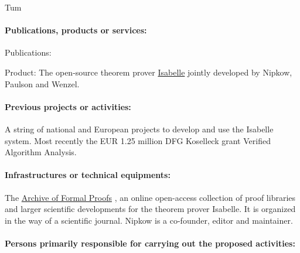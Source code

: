 \begin{sitedescription}{Tum}
\begin{compactitem}
\item{} 
\end{compactitem}

\paragraph{Publications, products or services:}
Publications: \cite{LNCS2283,BlanchetteHMN-CICM15,Wenzel:2015:APPA,PaulsonNW-FAC19}

Product: The open-source theorem prover  \href{https://isabelle.in.tum.de}{Isabelle}
jointly developed by Nipkow, Paulson and Wenzel.

\paragraph{Previous projects or activities:}

A string of national and European projects to develop and use the Isabelle
system. Most recently the EUR 1.25 million DFG Koselleck grant Verified Algorithm Analysis.

\paragraph{Infrastructures or technical equipments:}

The \href{http://www.isa-afp.org}{Archive of Formal Proofs} \cite{isabelle-afp}, an online
open-access collection of proof libraries and larger scientific
developments for the theorem prover Isabelle. It is organized in the
way of a scientific journal.  Nipkow is a co-founder, editor and maintainer.

\paragraph{Persons primarily responsible for carrying out the proposed activities:}


\end{sitedescription}
